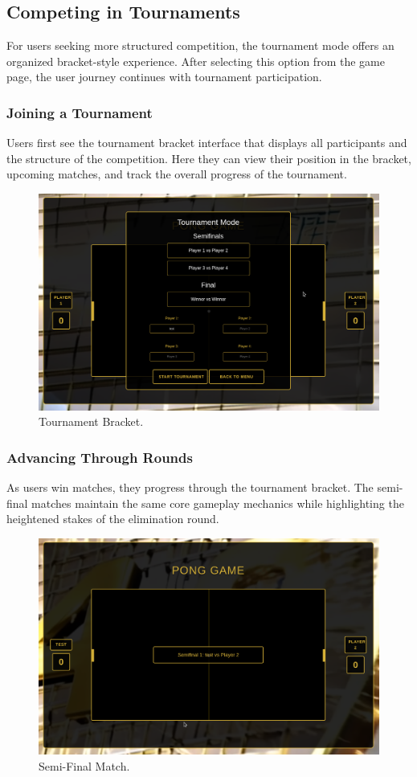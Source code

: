 \subsection{Competing in Tournaments}

For users seeking more structured competition, the tournament mode offers an organized bracket-style experience. After selecting this option from the game page, the user journey continues with tournament participation.

\subsubsection{Joining a Tournament} Users first see the tournament bracket interface that displays all participants and the structure of the competition. Here they can view their position in the bracket, upcoming matches, and track the overall progress of the tournament.

\begin{figure}[H]
    \centering
    \includegraphics[width=0.65\linewidth]{Figures/images/new_images/GameTournament.png}
    \caption{Tournament Bracket.} %
    \label{fig:tournament-bracket-journey}
\end{figure}

\subsubsection{Advancing Through Rounds} As users win matches, they progress through the tournament bracket. The semi-final matches maintain the same core gameplay mechanics while highlighting the heightened stakes of the elimination round.

\begin{figure}[H]
    \centering
    \includegraphics[width=0.65\linewidth]{Figures/images/new_images/GameTournementSemiFinal1.png}
    \caption{Semi-Final Match.} %
    \label{fig:tournament-semifinal-journey}
\end{figure}

